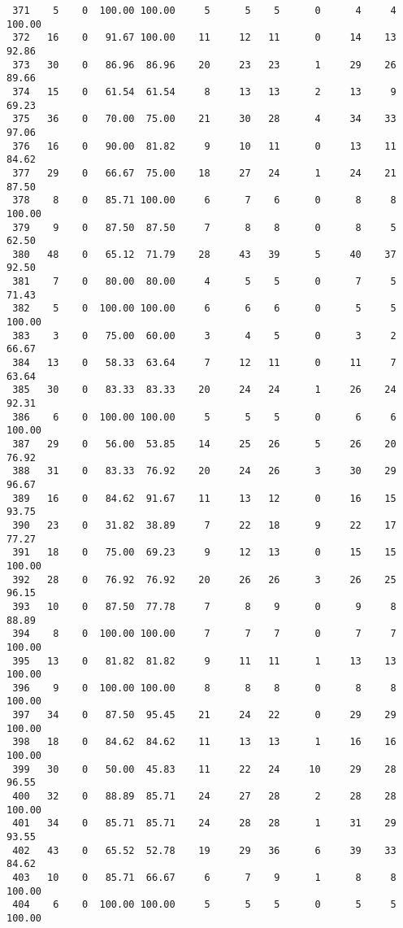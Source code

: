 \begin{verbatim}
 371    5    0  100.00 100.00     5      5    5      0      4     4   100.00
 372   16    0   91.67 100.00    11     12   11      0     14    13    92.86
 373   30    0   86.96  86.96    20     23   23      1     29    26    89.66
 374   15    0   61.54  61.54     8     13   13      2     13     9    69.23
 375   36    0   70.00  75.00    21     30   28      4     34    33    97.06
 376   16    0   90.00  81.82     9     10   11      0     13    11    84.62
 377   29    0   66.67  75.00    18     27   24      1     24    21    87.50
 378    8    0   85.71 100.00     6      7    6      0      8     8   100.00
 379    9    0   87.50  87.50     7      8    8      0      8     5    62.50
 380   48    0   65.12  71.79    28     43   39      5     40    37    92.50
 381    7    0   80.00  80.00     4      5    5      0      7     5    71.43
 382    5    0  100.00 100.00     6      6    6      0      5     5   100.00
 383    3    0   75.00  60.00     3      4    5      0      3     2    66.67
 384   13    0   58.33  63.64     7     12   11      0     11     7    63.64
 385   30    0   83.33  83.33    20     24   24      1     26    24    92.31
 386    6    0  100.00 100.00     5      5    5      0      6     6   100.00
 387   29    0   56.00  53.85    14     25   26      5     26    20    76.92
 388   31    0   83.33  76.92    20     24   26      3     30    29    96.67
 389   16    0   84.62  91.67    11     13   12      0     16    15    93.75
 390   23    0   31.82  38.89     7     22   18      9     22    17    77.27
 391   18    0   75.00  69.23     9     12   13      0     15    15   100.00
 392   28    0   76.92  76.92    20     26   26      3     26    25    96.15
 393   10    0   87.50  77.78     7      8    9      0      9     8    88.89
 394    8    0  100.00 100.00     7      7    7      0      7     7   100.00
 395   13    0   81.82  81.82     9     11   11      1     13    13   100.00
 396    9    0  100.00 100.00     8      8    8      0      8     8   100.00
 397   34    0   87.50  95.45    21     24   22      0     29    29   100.00
 398   18    0   84.62  84.62    11     13   13      1     16    16   100.00
 399   30    0   50.00  45.83    11     22   24     10     29    28    96.55
 400   32    0   88.89  85.71    24     27   28      2     28    28   100.00
 401   34    0   85.71  85.71    24     28   28      1     31    29    93.55
 402   43    0   65.52  52.78    19     29   36      6     39    33    84.62
 403   10    0   85.71  66.67     6      7    9      1      8     8   100.00
 404    6    0  100.00 100.00     5      5    5      0      5     5   100.00

\end{verbatim}
